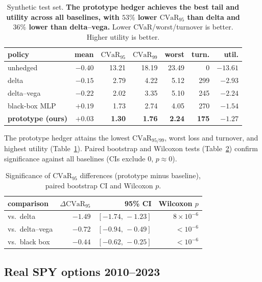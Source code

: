 \documentclass[sigconf,anonymous]{acmart}
\begin{document}
\begin{table}[t]
\centering
\caption{Synthetic test set. \textbf{The prototype hedger achieves the best tail
and utility across all baselines, with $53\%$ lower $\mathrm{CVaR}_{95}$ than
delta and $36\%$ lower than delta--vega.} Lower CVaR/worst/turnover is better.
Higher utility is better.}
\label{tab:synthetic}
\small
\setlength{\tabcolsep}{4pt}
\begin{tabular}{lrrrrrr}
\toprule
policy & mean & $\mathrm{CVaR}_{95}$ & $\mathrm{CVaR}_{99}$ & worst & turn. & util. \\
\midrule
unhedged       & $-0.40$ & 13.21 & 18.19 & 23.49 & 0   & $-13.61$ \\
delta          & $-0.15$ & 2.79  & 4.22  & 5.12  & 299 & $-2.93$ \\
delta--vega    & $-0.22$ & 2.02  & 3.35  & 5.10  & 245 & $-2.24$ \\
black-box MLP  & $+0.19$ & 1.73  & 2.74  & 4.05  & 270 & $-1.54$ \\
\textbf{prototype (ours)} & $+0.03$ & \textbf{1.30} & \textbf{1.76} & \textbf{2.24} & \textbf{175} & \textbf{$-1.27$} \\
\bottomrule
\end{tabular}
\end{table}

The prototype hedger attains the lowest $\mathrm{CVaR}_{95/99}$, worst loss and
turnover, and highest utility (Table~\ref{tab:synthetic}).  Paired bootstrap and
Wilcoxon tests (Table~\ref{tab:significance}) confirm significance against all
baselines (CIs exclude 0, $p \approx 0$).

\begin{table}[t]
\centering
\caption{Significance of $\mathrm{CVaR}_{95}$ differences (prototype minus
baseline), paired bootstrap CI and Wilcoxon $p$.}
\label{tab:significance}
\small
\begin{tabular}{lrrr}
\toprule
comparison & $\Delta\mathrm{CVaR}_{95}$ & 95\% CI & Wilcoxon $p$ \\
\midrule
vs.\ delta       & $-1.49$ & $[-1.74,\,-1.23]$ & $8\!\times\!10^{-6}$ \\
vs.\ delta--vega & $-0.72$ & $[-0.94,\,-0.49]$ & $<10^{-6}$ \\
vs.\ black box   & $-0.44$ & $[-0.62,\,-0.25]$ & $<10^{-6}$ \\
\bottomrule
\end{tabular}
\end{table}

\subsection{Real SPY options 2010--2023}
\end{document}
